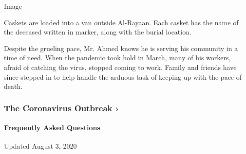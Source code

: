 Image

Caskets are loaded into a van outside Al-Rayaan. Each casket has the
name of the deceased written in marker, along with the burial location.

Despite the grueling pace, Mr. Ahmed knows he is serving his community
in a time of need. When the pandemic took hold in March, many of his
workers, afraid of catching the virus, stopped coming to work. Family
and friends have since stepped in to help handle the arduous task of
keeping up with the pace of death.

\href{https://www.nytimes.com/news-event/coronavirus?action=click\&pgtype=Article\&state=default\&region=MAIN_CONTENT_3\&context=storylines_faq}{}

\hypertarget{the-coronavirus-outbreak-}{%
\subsubsection{The Coronavirus Outbreak
›}\label{the-coronavirus-outbreak-}}

\hypertarget{frequently-asked-questions}{%
\paragraph{Frequently Asked
Questions}\label{frequently-asked-questions}}

Updated August 3, 2020


